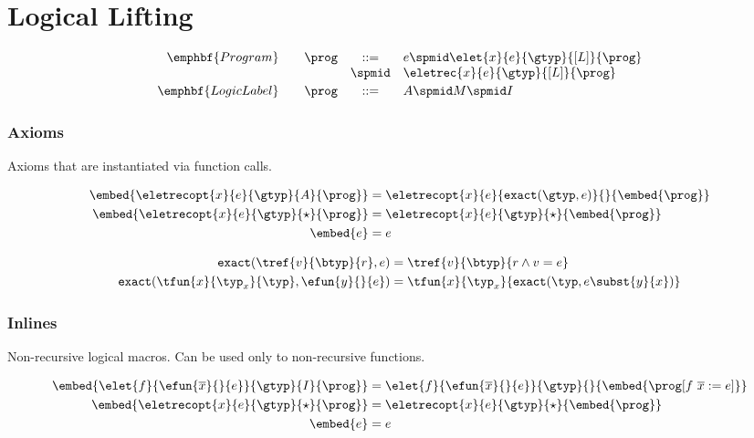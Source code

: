 \section{Logical Lifting}

\begin{figure}[t!]
\centering
$$
\begin{array}{rrcl}
\emphbf{Program} \quad 
  & \prog & ::= & e \spmid \elet{x}{e}{\gtyp}{[L]}{\prog}\\
  & & \spmid & \eletrec{x}{e}{\gtyp}{[L]}{\prog}
\\[0.03in] 

\emphbf{Logic Label} \quad 
  & \prog & ::= & A \spmid M \spmid I 
\end{array}
$$
\end{figure}
\subsubsection{Axioms}
Axioms that are instantiated via function calls. 

\newcommand\exacttype[2]{\ensuremath{\mathtt{exact}(#1, #2)}\xspace}
\newcommand\exacttypefun[3]{\ensuremath{\mathtt{exactfun}(#1, #2, #3)}\xspace}
\newcommand\inline[2]{\ensuremath{[#1 := #2]}\xspace}
\begin{align*}
\embed{\eletrecopt{x}{e}{\gtyp}{A}{\prog}}
  &= \eletrecopt{x}{e}{\exacttype{\gtyp}{e}}{}{\embed{\prog}}\\
\embed{\eletrecopt{x}{e}{\gtyp}{\star}{\prog}}
  &= \eletrecopt{x}{e}{\gtyp}{\star}{\embed{\prog}}\\
\embed{e} &= e 
\end{align*}


\begin{align*}
\exacttype{\tref{v}{\btyp}{r}}{e} &= \tref{v}{\btyp}{r \land v = e}\\
\exacttype{\tfun{x}{\typ_x}{\typ}}{\efun{y}{}{e}} &=\tfun{x}{\typ_x}{\exacttype{\typ}{e\subst{y}{x}}} 
\end{align*}


\subsubsection{Inlines}
Non-recursive logical macros. Can be used only to non-recursive functions. 

\begin{align*}
\embed{\elet{f}{\efun{\overline{x}}{}{e}}{\gtyp}{I}{\prog}}
  &= \elet{f}{\efun{\overline{x}}{}{e}}{\gtyp}{}{\embed{\prog\inline{f\ \overline{x}}
  {e}}}\\
\embed{\eletrecopt{x}{e}{\gtyp}{\star}{\prog}}
  &= \eletrecopt{x}{e}{\gtyp}{\star}{\embed{\prog}}\\
\embed{e} &= e 
\end{align*}


